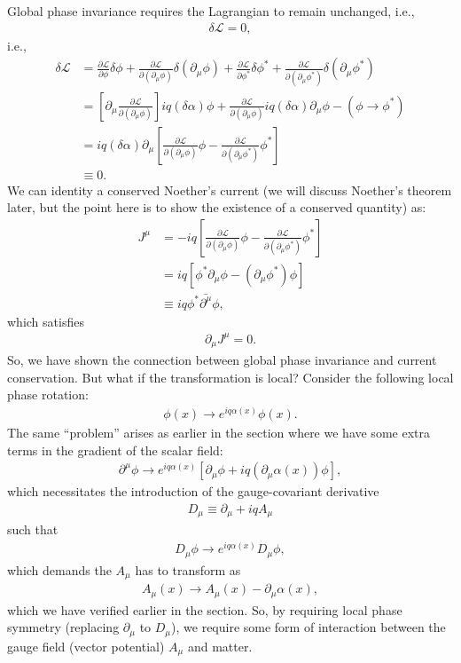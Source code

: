 \documentclass{book}
\numberwithin{equation}{section}
\theoremstyle{definition}
\newcommand{\p}{\partial}
\newcommand{\lag}{\mathcal{L}}
\begin{document}
Global phase invariance requires the Lagrangian to remain unchanged, i.e.,
\begin{align}
\delta \lag = 0,
\end{align}
i.e.,
\begin{align}
\delta\lag &= \frac{\p \lag}{\p \phi}\delta \phi + \frac{\p \lag}{\p (\p_\mu\phi)}\delta (\p_\mu\phi) + \frac{\p \lag}{\p \phi^*}\delta \phi^* + \frac{\p \lag}{\p (\p_\mu\phi^*)}\delta (\p_\mu\phi^*)\\
&= \left[ \p_\mu \frac{\p \lag}{\p (\p_\mu\phi)}   \right]iq(\delta \alpha)\phi + \frac{\p\lag}{\p(\p_\mu\phi)}iq(\delta \alpha)\p_\mu\phi - (\phi\to \phi^*)\\
&= iq(\delta \alpha)\p_\mu \left[ \frac{\p\lag}{\p(\p_\mu \phi)}\phi - \frac{\p\lag}{\p(\p_\mu \phi^*)}\phi^* \right]\\ 
&\equiv 0. 
\end{align}
We can identity a conserved Noether's current (we will discuss Noether's theorem later, but the point here is to show the existence of a conserved quantity) as:
\begin{align}
J^\mu &= -iq\left[ \frac{\p\lag}{\p(\p_\mu \phi)}\phi - \frac{\p\lag}{\p(\p_\mu \phi^*)}\phi^* \right]\\
&= iq\left[\phi^*\p_\mu\phi - (\p_\mu\phi^*)\phi\right]\\
&\equiv iq\phi^*\bar{\p^\mu}\phi,
\end{align}
which satisfies
\begin{align}
\p_\mu J^\mu = 0.
\end{align}
So, we have shown the connection between global phase invariance and current conservation. But what if the transformation is local? Consider the following local phase rotation:
\begin{align}
\phi(x) \to e^{iq\alpha(x)}\phi(x).
\end{align}
The same ``problem'' arises as earlier in the section where we have some extra terms in the gradient of the scalar field:
\begin{align}
\p^\mu \phi \to e^{iq\alpha(x)}\left[ \p_\mu\phi +  iq(\p_\mu \alpha(x))\phi \right],
\end{align}
which necessitates the introduction of the gauge-covariant derivative
\begin{align}
D_\mu \equiv \p_\mu + iq A_\mu
\end{align}
such that
\begin{align}
D_\mu\phi \to e^{iq\alpha(x)}D_\mu \phi,
\end{align}
which demands the $A_\mu$ has to transform as
\begin{align}
A_\mu(x) \to A_\mu(x) - \p_\mu \alpha(x),
\end{align}
which we have verified earlier in the section. So, by requiring local phase symmetry (replacing $\p_\mu$ to $D_\mu$), we require some form of interaction between the gauge field (vector potential) $A_\mu$ and matter. 
\end{document}
